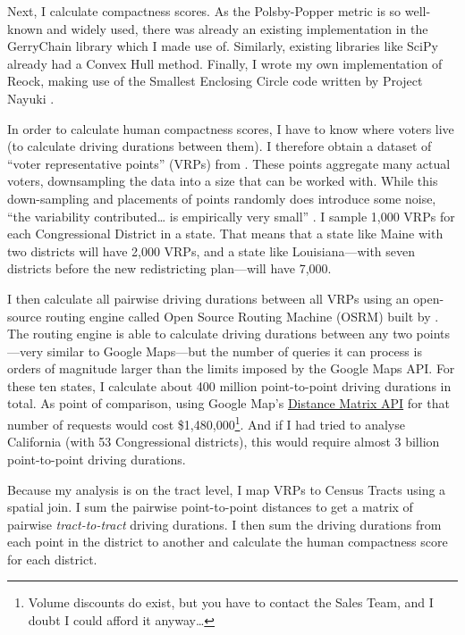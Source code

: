 \documentclass[]{article}
\begin{document}
Next, I calculate compactness scores. As the Polsby-Popper metric is so
well-known and widely used, there was already an existing implementation
in the GerryChain library which I made use of. Similarly, existing
libraries like SciPy already had a Convex Hull method. Finally, I wrote
my own implementation of Reock, making use of the Smallest Enclosing
Circle code written by Project Nayuki \citep{nayuki2020}.

In order to calculate human compactness scores, I have to know where
voters live (to calculate driving durations between them). I therefore
obtain a dataset of ``voter representative points'' (VRPs) from
\cite{er2019}. These points aggregate many actual voters, downsampling
the data into a size that can be worked with. While this down-sampling
and placements of points randomly does introduce some noise, ``the
variability contributed\ldots{} is empirically very small''
\citep{er2019}. I sample 1,000 VRPs for each Congressional District in a
state. That means that a state like Maine with two districts will have
2,000 VRPs, and a state like Louisiana---with seven districts before the
new redistricting plan---will have 7,000.

I then calculate all pairwise driving durations between all VRPs using
an open-source routing engine called Open Source Routing Machine (OSRM)
built by \cite{osrm}. The routing engine is able to calculate driving
durations between any two points---very similar to Google Maps---but the
number of queries it can process is orders of magnitude larger than the
limits imposed by the Google Maps API. For these ten states, I calculate
about 400 million point-to-point driving durations in total. As point of
comparison, using Google Map's
\href{https://developers.google.com/maps/documentation/distance-matrix/usage-and-billing}{Distance
Matrix API} for that number of requests would cost \$1,480,000\footnote{Volume
  discounts do exist, but you have to contact the Sales Team, and I
  doubt I could afford it anyway\ldots{}}. And if I had tried to analyse
California (with 53 Congressional districts), this would require almost
3 billion point-to-point driving durations.

Because my analysis is on the tract level, I map VRPs to Census Tracts
using a spatial join. I sum the pairwise point-to-point distances to get
a matrix of pairwise \emph{tract-to-tract} driving durations. I then sum
the driving durations from each point in the district to another and
calculate the human compactness score for each district.
\end{document}
